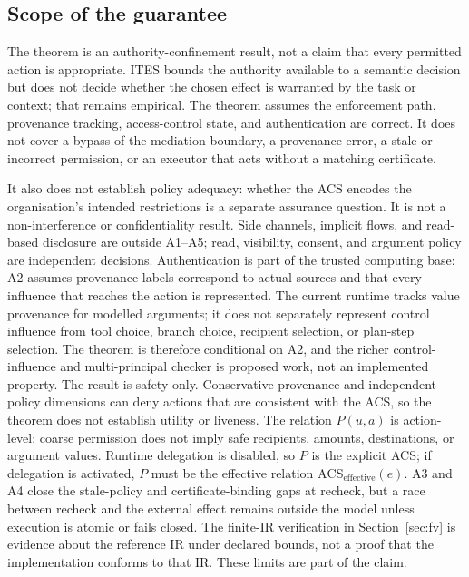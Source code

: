 \documentclass[11pt]{article}
\begin{document}
\subsection{Scope of the guarantee}

The theorem is an authority-confinement result, not a claim that every
permitted action is appropriate. ITES bounds the authority available to a
semantic decision but does not decide whether the chosen effect is warranted
by the task or context; that remains empirical. The theorem assumes the
enforcement path, provenance tracking, access-control state, and
authentication are correct. It does not cover a bypass of the mediation
boundary, a provenance error, a stale or incorrect permission, or an
executor that acts without a matching certificate.

It also does not establish policy adequacy: whether the ACS encodes the
organisation's intended restrictions is a separate assurance question. It is
not a non-interference or confidentiality result. Side channels, implicit
flows, and read-based disclosure are outside A1--A5; read, visibility,
consent, and argument policy are independent decisions. Authentication is
part of the trusted computing base: A2 assumes provenance labels correspond
to actual sources and that every influence that reaches the action is
represented. The current runtime tracks value provenance for modelled
arguments; it does not separately represent control influence from tool
choice, branch choice, recipient selection, or plan-step selection. The
theorem is therefore conditional on A2, and the richer control-influence and
multi-principal checker is proposed work, not an implemented property. The
result is safety-only. Conservative provenance and
independent policy dimensions can deny actions that are consistent with the
ACS, so the theorem does not establish utility or liveness. The relation
$P(u,a)$ is action-level; coarse permission does not imply safe recipients,
amounts, destinations, or argument values. Runtime delegation is disabled,
so $P$ is the explicit ACS; if delegation is activated, $P$ must be the
effective relation $\mathrm{ACS}_{\mathrm{effective}}(e)$. A3 and A4 close
the stale-policy and certificate-binding gaps at recheck, but a race between
recheck and the external effect remains outside the model unless execution
is atomic or fails closed. The finite-IR verification in
Section~\ref{sec:fv} is evidence about the reference IR under declared
bounds, not a proof that the implementation conforms to that IR. These
limits are part of the claim.
\end{document}
